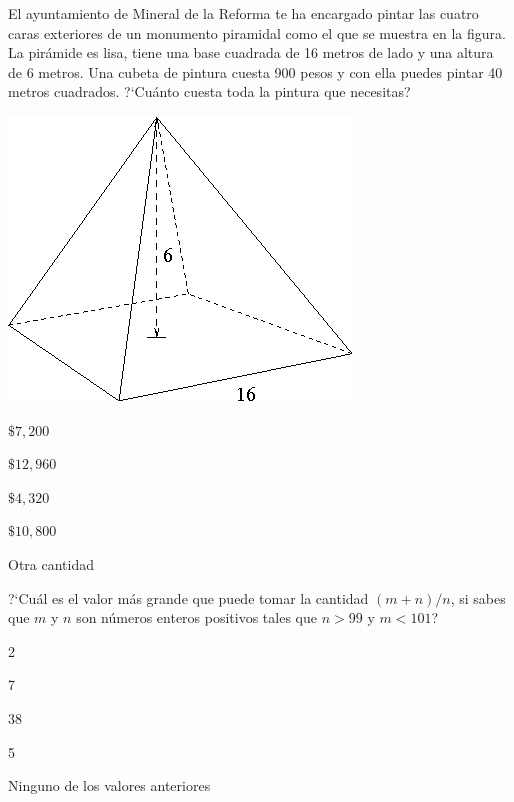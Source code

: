 \begin{Problema}{7}
  El ayuntamiento de Mineral de la Reforma te ha encargado pintar las
  cuatro caras exteriores de un monumento piramidal como el que se
  muestra en la figura. La pir\'amide es lisa, tiene una base cuadrada
  de 16 metros de lado y una altura de 6 metros. Una cubeta de pintura
  cuesta 900 pesos y con ella puedes pintar 40 metros
  cuadrados. ?`Cu\'anto cuesta toda la pintura que necesitas?

  \begin{center}
    \includegraphics[scale=.44]{OHMpyramid.png}
  \end{center}

  \begin{inparaenum}
  \item $\$7,200$ \quad\qquad
  \item $\$12,960$ \quad\qquad
  \item $\$4,320$ \quad\qquad
  \item $\$10,800$ \quad\qquad
  \item Otra cantidad
  \end{inparaenum}
\end{Problema}

\begin{Solucion}
  
\end{Solucion}

\begin{Problema}{8}
  ?`Cu\'al es el valor m\'as grande que puede tomar la cantidad 
  $\displaystyle{(m+n)/n}$, si sabes que $m$ y $n$ son n\'umeros enteros positivos 
  tales que $n>99$ y $m<101$?

  \begin{inparaenum}
  \item 2 \esp
  \item 7 \esp
  \item 38 \esp
  \item 5 \esp
  \item Ninguno de los valores anteriores
  \end{inparaenum}
\end{Problema}

